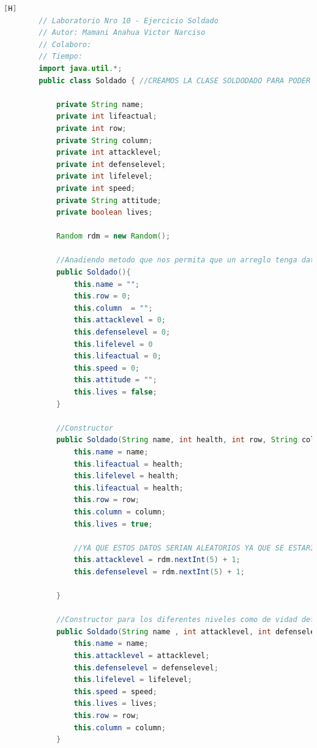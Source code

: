 \documentclass{article}
\begin{document}
	\begin{lstlisting}[language=java,caption={Las lineas de codigos del metodo creado:}][H]
		// Laboratorio Nro 10 - Ejercicio Soldado
		// Autor: Mamani Anahua Victor Narciso
		// Colaboro:
		// Tiempo:
		import java.util.*;
		public class Soldado { //CREAMOS LA CLASE SOLDODADO PARA PODER USAR UN ARREGLO BIDIMENSIONAL DONDE NECESITAMOS LA VIDA , EL NOMBRE DEL SOLDADO Y TAMBIEN SU POSICION COMO LA FILA Y LA COLUMNA   
		
			private String name;
			private int lifeactual;
			private int row;
			private String column;
			private int attacklevel;
			private int defenselevel;
			private int lifelevel;
			private int speed;
			private String attitude;
			private boolean lives;
		
			Random rdm = new Random();
		
			//Anadiendo metodo que nos permita que un arreglo tenga datos nulos si este esta vacio
			public Soldado(){
				this.name = "";
				this.row = 0;
				this.column  = "";
				this.attacklevel = 0;
				this.defenselevel = 0;
				this.lifelevel = 0
				this.lifeactual = 0;
				this.speed = 0;
				this.attitude = "";
				this.lives = false;
			}
		
			//Constructor
			public Soldado(String name, int health, int row, String column){
				this.name = name;
				this.lifeactual = health;
				this.lifelevel = health;
				this.lifeactual = health;
				this.row = row;
				this.column = column;
				this.lives = true;
				
				//YA QUE ESTOS DATOS SERIAN ALEATORIOS YA QUE SE ESTARIA CREANDO EL SOLDADO TENDRIAMOS DATOS QUE SERIAN COMO ATTACKLEVEL DEFENSELEVEL EL CUAL TENDRIAN QUE SER ALEATORIOS    
				this.attacklevel = rdm.nextInt(5) + 1;
				this.defenselevel = rdm.nextInt(5) + 1;
		
			}
			
			//Constructor para los diferentes niveles como de vidad defensa ataque velocidad
			public Soldado(String name , int attacklevel, int defenselevel, int lifelevel, int speed, boolean lives, int row, String column) {
				this.name = name;
				this.attacklevel = attacklevel;
				this.defenselevel = defenselevel;
				this.lifelevel = lifelevel;
				this.speed = speed;
				this.lives = lives;
				this.row = row;
				this.column = column;
			}
		

\end{lstlisting}
\end{document}
